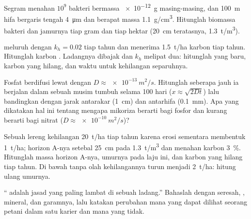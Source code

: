 \begin{exercise}[$\star\star$]\label{exo:b2:living-soil:8}
Segram  menahan $10^{9}$ bakteri bermassa \qty{e-12}{g}
masing-masing, dan \qty{100}{m} hifa bergaris tengah \qty{4}{\micro m}
dan berapat massa \qty{1.1}{g/cm^3}. Hitunglah biomassa bakteri dan
jamurnya tiap gram dan tiap hektar (\qty{20}{cm} teratasnya,
\qty{1.3}{t/m^3}).
\end{exercise}

\begin{exercise}[$\star\star$]\label{exo:b2:living-soil:9}
  meluruh dengan $k_h = 0.02$ tiap tahun dan menerima
\qty{1.5}{t/ha} karbon tiap tahun. Hitunglah karbon  . Ladangnya dibajak dan $k_h$ melipat dua: hitunglah  yang baru, karbon yang hilang, dan waktu untuk kehilangan
separuhnya.
\end{exercise}

\begin{exercise}[$\star\star\star$]\label{exo:b2:living-soil:10}
Fosfat berdifusi lewat  dengan $D \approx \qty{e-13}{m^2/s}$.
Hitunglah seberapa jauh ia berjalan dalam sebuah musim tumbuh selama
\num{100} hari ($x \approx \sqrt{2Dt}$) lalu bandingkan dengan jarak
antarakar (\qty{1}{cm}) dan antarhifa (\qty{0.1}{mm}). Apa yang
dikatakan hal ini tentang mengapa mikoriza berarti bagi fosfor dan
kurang berarti bagi nitrat ($D \approx \qty{e-10}{m^2/s}$)?
\end{exercise}

\begin{exercise}[$\star\star\star$]\label{exo:b2:living-soil:11}
Sebuah lereng kehilangan \qty{20}{t/ha}  tiap tahun karena erosi
sementara membentuk \qty{1}{t/ha}; horizon A-nya setebal \qty{25}{cm}
pada \qty{1.3}{t/m^3} dan menahan karbon \qty{3}{\%}. Hitunglah massa
horizon A-nya, umurnya pada laju ini, dan karbon yang hilang tiap
tahun. Di bawah tanpa olah  kehilangannya turun menjadi
\qty{2}{t/ha}: hitung ulang umurnya.
\end{exercise}

\begin{exercise}[$\star\star\star$]\label{exo:b2:living-soil:12}
`` adalah jasad yang paling lambat di sebuah ladang.'' Bahaslah
dengan  seresah, ,  mineral, dan garamnya, lalu
katakan perubahan mana yang dapat dilihat seorang petani dalam satu
karier dan mana yang tidak.
\end{exercise}


